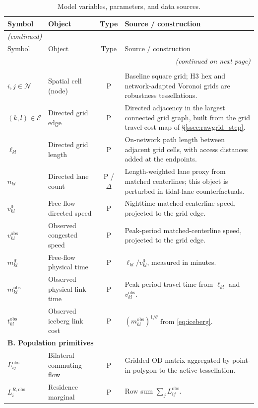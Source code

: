 \documentclass[12pt]{article}
\newcommand{\N}{\mathcal N}
\newcommand{\E}{\mathcal E}
\newcommand{\tbar}{m^{\mathrm{ff}}}
\newcommand{\tkl}{t_{kl}}
\newcommand{\obs}{\mathrm{obs}}
\begin{document}
\begin{small}
\begin{longtable}{p{2.0cm}p{4.2cm}cp{6.5cm}}
\caption{Model variables, parameters, and data sources.}
\label{tab:inventory}\\
\toprule
Symbol & Object & Type & Source / construction \\
\midrule
\endfirsthead
\multicolumn{4}{l}{\emph{(continued)}}\\
\toprule
Symbol & Object & Type & Source / construction \\
\midrule
\endhead
\midrule
\multicolumn{4}{r}{\emph{(continued on next page)}}\\
\endfoot
\bottomrule
\endlastfoot
\multicolumn{4}{l}{\textbf{A. Spatial primitives}}\\
$i,j\in\N$ & Spatial cell (node) & P & Baseline square grid; H3 hex and network-adapted Voronoi grids are robustness tessellations.\\
$(k,l)\in\E$ & Directed grid edge & P & Directed adjacency in the largest connected grid graph, built from the grid travel-cost map of \S\ref{ssec:rawgrid_step}.\\
$\ell_{kl}$ & Directed grid length & P & On-network path length between adjacent grid cells, with access distances added at the endpoints.\\
$n_{kl}$ & Directed lane count & P / $\Delta$ & Length-weighted lane proxy from matched centerlines; this object is perturbed in tidal-lane counterfactuals.\\
$v^{0}_{kl}$ & Free-flow directed speed & P & Nighttime matched-centerline speed, projected to the grid edge.\\
$v^{\obs}_{kl}$ & Observed congested speed & P & Peak-period matched-centerline speed, projected to the grid edge.\\
$\tbar_{kl}$ & Free-flow physical time & P & $\ell_{kl}/v^{0}_{kl}$, measured in minutes.\\
$m_{kl}^{\obs}$ & Observed physical link time & P & Peak-period travel time from $\ell_{kl}$ and $v_{kl}^{\obs}$.\\
$\tkl^{\obs}$ & Observed iceberg link cost & P & $(m_{kl}^{\obs})^{1/\theta}$ from \eqref{eq:iceberg}.\\
\midrule
\multicolumn{4}{l}{\textbf{B. Population primitives}}\\
$L_{ij}^{\obs}$ & Bilateral commuting flow & P & Gridded OD matrix aggregated by point-in-polygon to the active tessellation.\\
$L_i^{R,\obs}$ & Residence marginal & P & Row sum $\sum_j L_{ij}^{\obs}$.\\

\end{longtable}
\end{small}
\end{document}
